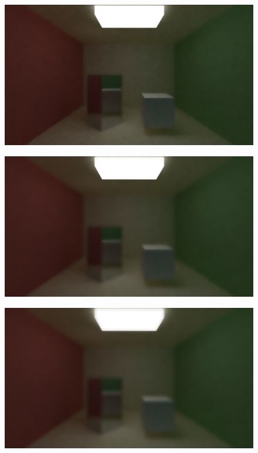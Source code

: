 \documentclass[titlepage,12pt]{report}
\begin{document}
\begin{appendices}
\begin{figure}[H]
	\centering
	\includegraphics[scale=0.5]{media/bilateral/cornell_normal_50_bilateral_filter_21_10_10.png}
	\label{ap33}
\end{figure}

\begin{figure}[H]
	\centering
	\includegraphics[scale=0.5]{media/bilateral/cornell_normal_50_bilateral_filter_21_10_20.png}
	\label{ap34}
\end{figure}

\begin{figure}[H]
	\centering
	\includegraphics[scale=0.5]{media/bilateral/cornell_normal_50_bilateral_filter_21_10_40.png}
	\label{ap35}
\end{figure}


\end{appendices}
\end{document}
